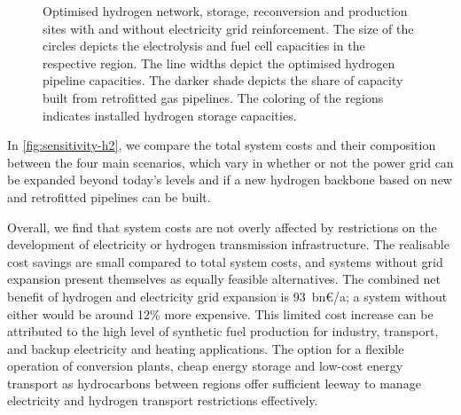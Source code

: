 \begin{figure}
    \centering
     \caption{Optimised hydrogen network, storage, reconversion and production sites with and
    without electricity grid reinforcement. The size of the circles depicts the
    electrolysis and fuel cell capacities in the respective region. The line
    widths depict the optimised hydrogen pipeline capacities. The darker shade
    depicts the share of capacity built from retrofitted gas pipelines. The
    coloring of the regions indicates installed hydrogen storage capacities.}
    \label{fig:h2-network}
\end{figure}


In \cref{fig:sensitivity-h2}, we compare the total system costs and their
composition between the four main scenarios, which vary in whether or not the
power grid can be expanded beyond today's levels and if a new hydrogen backbone
based on new and retrofitted pipelines can be built.

Overall, we find that system costs are not overly affected by restrictions on
the development of electricity or hydrogen transmission infrastructure. The
realisable cost savings are small compared to total system costs, and systems
without grid expansion present themselves as equally feasible alternatives. The
combined net benefit of hydrogen and electricity grid expansion is 93~bn\euro/a;
a system without either would be around 12\% more expensive. This limited cost
increase can be attributed to the high level of synthetic fuel production for
industry, transport, and backup electricity and heating applications. The option
for a flexible operation of conversion plants, cheap energy storage and low-cost
energy transport as hydrocarbons between regions offer sufficient leeway to
manage electricity and hydrogen transport restrictions effectively.


